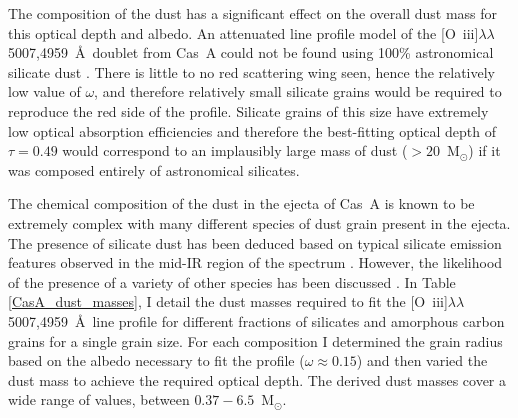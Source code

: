 The composition of the dust has a significant effect on the overall dust mass for this optical depth and albedo.  An attenuated line profile model of the [O~{\sc iii}]$\lambda\lambda$5007,4959~\AA\  doublet  from Cas~A could not be found using 100\% astronomical silicate dust \citep{Draine1984}.  There is little to no red scattering wing seen, hence the relatively low value of $\omega$, and therefore relatively small silicate grains would be required to reproduce the red side of the profile.  Silicate grains of this size have extremely low optical absorption efficiencies and therefore the best-fitting optical depth of $\tau=0.49$ would correspond to an implausibly large mass of dust ($>20$~M$_{\odot}$) if it was composed entirely of astronomical silicates.



The chemical composition of the dust in the ejecta of Cas~A is known to be extremely complex \citep{Rho2008,Arendt2014} with many different species of dust grain present in the ejecta.  The presence of silicate dust has been deduced based on typical silicate emission features observed in the mid-IR region of the spectrum \citep{Rho2008}.  However, the likelihood of the presence of a variety of other species has been discussed \citep{Arendt2014}. In Table \ref{CasA_dust_masses}, I detail the dust masses required to fit the [O~{\sc iii}]$\lambda\lambda$5007,4959~\AA\  line profile for different fractions of silicates and amorphous carbon grains for a single grain size.  For each composition I determined the grain radius based on the albedo necessary to fit the profile ($\omega\approx0.15$) and then varied the dust mass to achieve the required optical depth.  The derived dust masses cover a wide range of values, between $0.37 - 6.5$~M$_{\odot}$.   

